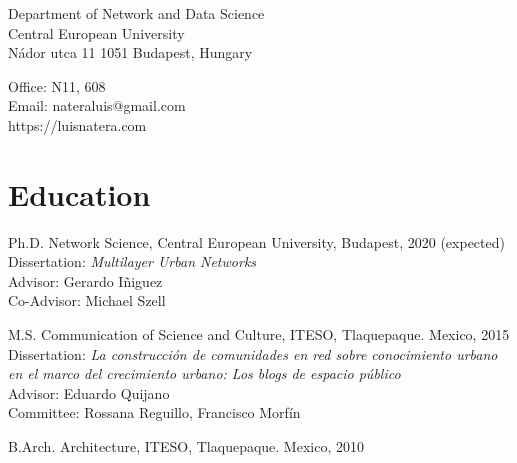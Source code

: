 \documentclass{academiccv}
\begin{document}
\raggedright

\namefont{\myname}

\vspace{1em}
\begin{minipage}[t]{0.495\textwidth}
  Department of Network and Data Science \\
  Central European University \\
  Nádor utca 11
  1051 Budapest, Hungary
\end{minipage}
\begin{minipage}[t]{0.495\textwidth}
  Office: N11, 608 \\
  Email: nateraluis@gmail.com \\
  https://luisnatera.com \\
\end{minipage}
\vspace{0.5em}



\section*{Education}

\begin{tablist}
	
\item[Ph.D. ] \tab Network Science, Central European University, Budapest, 2020 (expected) \\
                  Dissertation: \textit{Multilayer Urban Networks} \\
                  Advisor: Gerardo Iñiguez \\
                  Co-Advisor: Michael Szell
                  
\item[M.S.]  \tab Communication of Science and Culture, ITESO, Tlaquepaque. Mexico, 2015 \\
					Dissertation: \textit{La construcción de comunidades en red sobre conocimiento urbano en el marco del crecimiento urbano: Los blogs de espacio público}\\
					Advisor: Eduardo Quijano \\
					Committee: Rossana Reguillo, Francisco Morfín

\item[B.Arch.]  \tab Architecture,  ITESO, Tlaquepaque. Mexico, 2010

\end{tablist}
\end{document}
